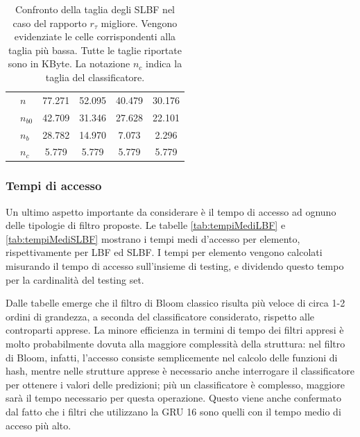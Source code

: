\documentclass[../../main.tex]{subfiles}
\begin{document}
\begin{table}[H]
\begin{tabular}{llcccc}
            \hdashline 
            \multirow{4}{*}{\textbf{GRU 4}} & $n$  & 77.271 & 52.095 & 40.479 & 30.176\\
            & $n_{b0}$ & 42.709 & 31.346 & 27.628 & 22.101\\
            & $n_{b}$ & 28.782 & 14.970 &  7.073 &  2.296\\
            & $n_c$ &  5.779 &  5.779 &  5.779 &  5.779\\
            \bottomrule          
        \end{tabular}
        \caption{Confronto della taglia degli SLBF nel caso del rapporto $r_{\tau}$ migliore. Vengono evidenziate le celle corrispondenti alla taglia più bassa. Tutte le taglie riportate sono in KByte. La notazione $n_c$ indica la taglia del classificatore.}
        \label{tab:confrontoFinaleSLBF}
    \end{table}

    \subsubsection{Tempi di accesso}
    Un ultimo aspetto importante da considerare è il tempo di accesso ad ognuno delle tipologie di filtro proposte. Le tabelle \ref{tab:tempiMediLBF} e \ref{tab:tempiMediSLBF} mostrano i tempi medi d'accesso per elemento, rispettivamente per LBF ed SLBF. I tempi per elemento vengono calcolati misurando il tempo di accesso sull'insieme di testing, e dividendo questo tempo per la cardinalità del testing set.

    Dalle tabelle emerge che il filtro di Bloom classico risulta più veloce di circa 1-2 ordini di grandezza, a seconda del classificatore considerato, rispetto alle controparti apprese. La minore efficienza in termini di tempo dei filtri appresi è molto probabilmente dovuta alla maggiore complessità della struttura: nel filtro di Bloom, infatti, l'accesso consiste semplicemente nel calcolo delle funzioni di hash, mentre nelle strutture apprese è necessario anche interrogare il classificatore per ottenere i valori delle predizioni; più un classificatore è complesso, maggiore sarà il tempo necessario per questa operazione. Questo viene anche confermato dal fatto che i filtri che utilizzano la GRU 16 sono quelli con il tempo medio di acceso più alto.
\end{document}
